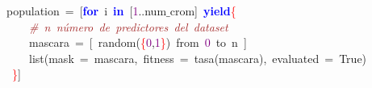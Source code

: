 \noindent
\mbox{}population\ \textcolor{BrickRed}{=}\ \textcolor{BrickRed}{[}\textbf{\textcolor{Blue}{for}}\ i\ \textbf{\textcolor{Blue}{in}}\ \textcolor{BrickRed}{[}\textcolor{Purple}{1}\textcolor{BrickRed}{..}num$\_$crom\textcolor{BrickRed}{]}\ \textbf{\textcolor{Blue}{yield}}\textcolor{Red}{\{} \\
\mbox{}\ \ \ \ \textit{\textcolor{Brown}{\#\ n\ número\ de\ predictores\ del\ dataset}} \\
\mbox{}\ \ \ \ mascara\ \textcolor{BrickRed}{=}\ \textcolor{BrickRed}{[}\ random\textcolor{BrickRed}{(}\textcolor{Red}{\{}\textcolor{Purple}{0}\textcolor{BrickRed}{,}\textcolor{Purple}{1}\textcolor{Red}{\}}\textcolor{BrickRed}{)}\ from\ \textcolor{Purple}{0}\ to\ n\ \textcolor{BrickRed}{]} \\
\mbox{}\ \ \ \ list\textcolor{BrickRed}{(}mask\ \textcolor{BrickRed}{=}\ mascara\textcolor{BrickRed}{,}\ fitness\ \textcolor{BrickRed}{=}\ tasa\textcolor{BrickRed}{(}mascara\textcolor{BrickRed}{),}\ evaluated\ \textcolor{BrickRed}{=}\ True\textcolor{BrickRed}{)} \\
\mbox{}\ \textcolor{Red}{\}}\textcolor{BrickRed}{]} \\
\mbox{}
